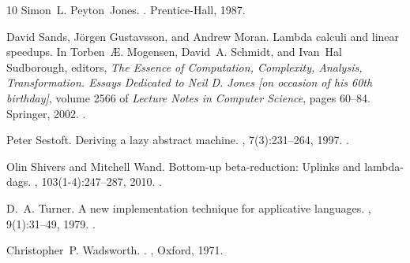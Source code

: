 \begin{thebibliography}{10}
Simon~L. Peyton~Jones.
.
\newblock Prentice-Hall, 1987.

David Sands, J{\"{o}}rgen Gustavsson, and Andrew Moran.
\newblock Lambda calculi and linear speedups.
\newblock In Torben~{\AE}. Mogensen, David~A. Schmidt, and Ivan~Hal Sudborough,
  editors, {\em The Essence of Computation, Complexity, Analysis,
  Transformation. Essays Dedicated to Neil D. Jones [on occasion of his 60th
  birthday]}, volume 2566 of {\em Lecture Notes in Computer Science}, pages
  60--84. Springer, 2002.
\newblock \href {https://doi.org/10.1007/3-540-36377-7\_4}
  {}.

Peter Sestoft.
\newblock Deriving a lazy abstract machine.
, 7(3):231--264, 1997.
\newblock \href {https://doi.org/10.1017/S0956796897002712}
  {}.

Olin Shivers and Mitchell Wand.
\newblock Bottom-up beta-reduction: Uplinks and lambda-dags.
, 103(1-4):247--287, 2010.
\newblock \href {https://doi.org/10.3233/FI-2010-328}
  {}.

D.~A. Turner.
\newblock A new implementation technique for applicative languages.
, 9(1):31--49, 1979.
\newblock \href {https://doi.org/10.1002/SPE.4380090105}
  {}.

Christopher~P. Wadsworth.
.
, Oxford, 1971.

\end{thebibliography}
